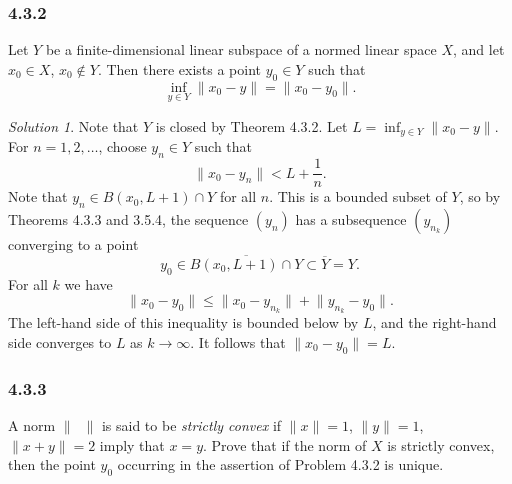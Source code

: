 \documentclass{report}
\newcommand{\norm}[1]{{\lVert #1 \rVert}}
\theoremstyle{remark}
\newtheorem*{solution}{Solution}
\begin{document}
\subsubsection*{4.3.2}
Let $Y$ be a finite-dimensional linear subspace of a normed linear space $X$, and let $x_0 \in X$, $x_0 \notin Y$. Then there exists a point $y_0 \in Y$ such that
\begin{equation*}
  \inf_{y \in Y} \norm{x_0 - y} = \norm{x_0 - y_0}.
\end{equation*}

\begin{solution}
  Note that $Y$ is closed by Theorem 4.3.2. Let $L = \inf_{y \in Y} \norm{x_0 - y}$. For $n = 1,2, \dots$, choose $y_n \in Y$ such that
  \begin{equation*}
    \norm{x_0 - y_n} < L + \frac{1}{n}.
  \end{equation*}
  Note that $y_n \in B(x_0, L+1) \cap Y$ for all $n$. This is a bounded subset of $Y$, so by Theorems 4.3.3 and 3.5.4, the sequence $(y_n)$ has a subsequence $(y_{n_k})$ converging to a point
  \begin{equation*}
    y_0 \in \overline{B(x_0, L+1) \cap Y} \subset \overline Y = Y.
  \end{equation*}
  For all $k$ we have
  \begin{equation*}
    \norm{x_0 - y_0} \le \norm{x_0 - y_{n_k}} + \norm{y_{n_k} - y_0}.
  \end{equation*}
  The left-hand side of this inequality is bounded below by $L$, and the right-hand side converges to $L$ as $k \to \infty$. It follows that $\norm{x_0 - y_0} = L$.
\end{solution}

\subsubsection*{4.3.3}
A norm $\norm{\phantom x}$ is said to be \emph{strictly convex} if $\norm x = 1$, $\norm y = 1$, $\norm{x+y} = 2$ imply that $x = y$. Prove that if the norm of $X$ is strictly convex, then the point $y_0$ occurring in the assertion of Problem 4.3.2 is unique.
\end{document}
